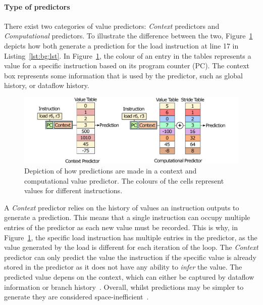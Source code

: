 \paragraph*{Type of predictors}
There exist two categories of value predictors: \textit{Context} predictors and \textit{Computational} predictors.
To illustrate the difference between the two, Figure~\ref{fig:pred_examples} depicts how both generate a prediction for the load instruction at line 17 in Listing~\ref{lst:bg:lst}.
In Figure~\ref{fig:pred_examples}, the colour of an entry in the tables represents a value for a specific instruction based on its program counter (PC).
The context box represents some information that is used by the predictor, such as global history, or dataflow history.

\begin{figure}[t]
    \centering
    \includegraphics[width=1\textwidth]{background/graphics/predic.pdf}
    \caption{Depiction of how predictions are made in a context and computational value predictor. The colours of the cells represent values for different instructions.}
    \label{fig:pred_examples}
	\vspace{-1em}
\end{figure}
A \textit{Context} predictor relies on the history of values an instruction outputs to generate a prediction.
This means that a single instruction can occupy multiple entries of the predictor as each new value must be recorded.
This is why, in Figure~\ref{fig:pred_examples}, the specific load instruction has multiple entries in the predictor, as the value generated by the load is different for each iteration of the loop.
The \textit{Context} predictor can only predict the value the instruction if the specific value is already stored in the predictor as it does not have any ability to \textit{infer} the value.
The predicted value depens on the context, which can either be captured by dataflow information or branch history~\cite{peraisVTAGE2014}.
Overall, whilst predictions may be simpler to generate they are considered space-inefficient~\cite{peraisBeBop2015}.


